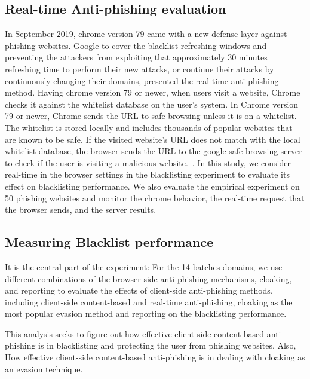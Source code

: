 \documentclass[letterpaper,twocolumn,10pt]{article}
\begin{document}
\subsection{Real-time Anti-phishing evaluation}

In September 2019, chrome version 79 came with a new defense layer against phishing websites. Google to cover the blacklist refreshing windows and preventing the attackers from exploiting that approximately 30 minutes refreshing time to perform their new attacks, or continue their attacks by continuously changing their domains, presented the real-time anti-phishing method.
Having chrome version 79 or newer, when users visit a website, Chrome checks it against the whitelist database on the user's system. 
In Chrome version 79 or newer, Chrome sends the URL to safe browsing unless it is on a whitelist. The whitelist is stored locally and includes thousands of popular websites that are known to be safe. If the visited website's URL does not match with the local whitelist database, the browser sends the URL to the google safe browsing server to check if the user is visiting a malicious website.~\cite{gsbapi,googlechromeprivacywhitepaper}. 
In this study, we consider real-time in the browser settings in the blacklisting experiment to evaluate its effect on blacklisting performance.
We also evaluate the empirical experiment on 50 phishing websites and monitor the chrome behavior, the real-time request that the browser sends, and the server results.

\subsection{Measuring Blacklist performance}
It is the central part of the experiment:
For the 14 batches domains, we use different combinations of the browser-side anti-phishing mechanisms, cloaking, and reporting to evaluate the effects of client-side anti-phishing methods, including client-side content-based and real-time anti-phishing, cloaking as the most popular evasion method and reporting on the blacklisting performance.

This analysis seeks to figure out how effective client-side content-based anti-phishing is in blacklisting and protecting the user from phishing websites. Also, How effective client-side content-based anti-phishing is in dealing with cloaking as an evasion technique.
\end{document}
